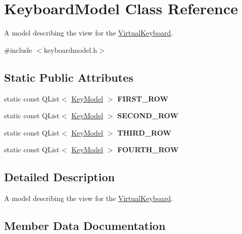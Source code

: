 \hypertarget{classKeyboardModel}{}\section{Keyboard\+Model Class Reference}
\label{classKeyboardModel}


A model describing the view for the \hyperlink{classVirtualKeyboard}{Virtual\+Keyboard}.  




{\ttfamily \#include $<$keyboardmodel.\+h$>$}

\subsection*{Static Public Attributes}
\begin{DoxyCompactItemize}
\item 
static const Q\+List$<$ \hyperlink{structKeyModel}{Key\+Model} $>$ {\bfseries F\+I\+R\+S\+T\+\_\+\+R\+O\+W}
\item 
static const Q\+List$<$ \hyperlink{structKeyModel}{Key\+Model} $>$ {\bfseries S\+E\+C\+O\+N\+D\+\_\+\+R\+O\+W}
\item 
static const Q\+List$<$ \hyperlink{structKeyModel}{Key\+Model} $>$ {\bfseries T\+H\+I\+R\+D\+\_\+\+R\+O\+W}
\item 
static const Q\+List$<$ \hyperlink{structKeyModel}{Key\+Model} $>$ {\bfseries F\+O\+U\+R\+T\+H\+\_\+\+R\+O\+W}
\end{DoxyCompactItemize}


\subsection{Detailed Description}
A model describing the view for the \hyperlink{classVirtualKeyboard}{Virtual\+Keyboard}. 

\subsection{Member Data Documentation}
\hypertarget{classKeyboardModel_a56682bd14da2f9b99672a72c8f0d403e}{}
